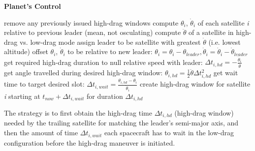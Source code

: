 \begin{algorithm}[H]
      \caption{\textbf{Planet's Control}}
      \begin{algorithmic}[1]
                  \State remove any previously issued high-drag windows
                  \State compute $\theta_i$, $\dot{\theta}_i$ of each satellite \textit{i} relative to previous leader (mean, not osculating)
                  \State compute $\ddot{\theta}$ of a satellite in high-drag vs. low-drag mode
                  \State assign leader to be satellite with greatest $\dot{\theta}$ (i.e. lowest altitude)
                        \State offset $\theta_i$, $\dot{\theta}_i$ to be relative to new leader: $\theta_i = \theta_i - \theta_{leader}, \dot{\theta}_i = \dot{\theta}_i - \dot{\theta}_{leader}$
                        \State get required high-drag duration to null relative speed with leader: $\Delta t_{i,hd} = - \frac{\dot{\theta}_i}{\ddot{\theta}}$
                        \State get angle travelled during desired high-drag window: $\theta_{i,hd} = \frac{1}{2} \ddot{\theta} \Delta t_{i,hd}^2$
                        \State get wait time to target desired slot: $\Delta t_{i,wait} = \frac{\theta_{i,hd} - \theta_i}{\dot{\theta}_i}$
                        \State create high-drag window for satellite \textit{i} starting at $t_{now} + \Delta t_{i,wait}$ for duration $\Delta t_{i,hd}$
                  \EndFor
            \EndProcedure
      \end{algorithmic}
\end{algorithm}

The strategy is to first obtain the high-drag time $\Delta t_{i,hd}$ (high-drag window) needed by the trailing satellite for matching the leader's semi-major axis, and then the amount of time $\Delta t_{i,wait}$ each spacecraft has to wait in the low-drag configuration before the high-drag maneuver is initiated.

